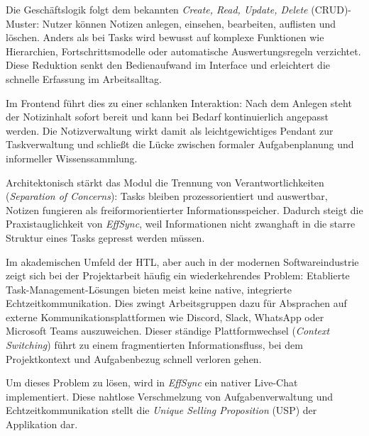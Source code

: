 Die Geschäftslogik folgt dem bekannten \textit{Create, Read, Update, Delete} (CRUD)-Muster: Nutzer können Notizen anlegen, einsehen, bearbeiten, auflisten und löschen. Anders als bei Tasks wird bewusst auf komplexe Funktionen wie Hierarchien, Fortschrittsmodelle oder automatische Auswertungsregeln verzichtet. Diese Reduktion senkt den Bedienaufwand im Interface und erleichtert die schnelle Erfassung im Arbeitsalltag.

Im Frontend führt dies zu einer schlanken Interaktion: Nach dem Anlegen steht der Notizinhalt sofort bereit und kann bei Bedarf kontinuierlich angepasst werden. Die Notizverwaltung wirkt damit als leichtgewichtiges Pendant zur Taskverwaltung und schließt die Lücke zwischen formaler Aufgabenplanung und informeller Wissenssammlung.

Architektonisch stärkt das Modul die Trennung von Verantwortlichkeiten (\textit{Separation of Concerns}): Tasks bleiben prozessorientiert und auswertbar, Notizen fungieren als freiformorientierter Informationsspeicher. Dadurch steigt die Praxistauglichkeit von \textit{EffSync}, weil Informationen nicht zwanghaft in die starre Struktur eines Tasks gepresst werden müssen.

\label{sec:live_chat}

Im akademischen Umfeld der HTL, aber auch in der modernen Softwareindustrie zeigt sich bei der Projektarbeit häufig ein wiederkehrendes Problem: Etablierte Task-Management-Lösungen bieten meist keine native, integrierte Echtzeitkommunikation\cite{trello_powerup_boardchat}\cite{atlassian_jira_11_3_documentation}\cite{atlassian_trello_guide}\cite{atlassian_trello_tour}. Dies zwingt Arbeitsgruppen dazu für Absprachen auf externe Kommunikationsplattformen wie Discord, Slack, WhatsApp oder Microsoft Teams auszuweichen. Dieser ständige Plattformwechsel (\textit{Context Switching}) führt zu einem fragmentierten Informationsfluss, bei dem Projektkontext und Aufgabenbezug schnell verloren gehen. 

Um dieses Problem zu lösen, wird in \textit{EffSync} ein nativer Live-Chat implementiert. Diese nahtlose Verschmelzung von Aufgabenverwaltung und Echtzeitkommunikation stellt die \textit{Unique Selling Proposition} (USP) der Applikation dar. 

